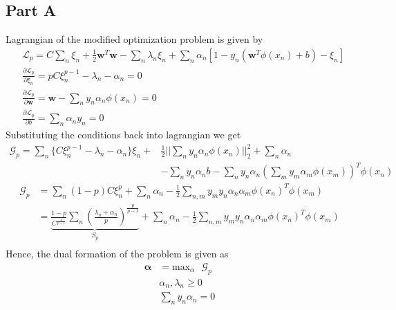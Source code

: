 \documentclass[11pt]{article}
\begin{document}
\subsection{Part A}
Lagrangian of the modified optimization problem is given by
\begin{equation*}
	\begin{split}
		& \mathcal{L}_p = C\sum_n\xi_n + \frac{1}{2}\boldsymbol{w}^T\boldsymbol{w} - \sum_n\lambda_n\xi_n + \sum_n\alpha_n[1-y_n(\boldsymbol{w}^T\phi(x_n)+b)-\xi_n] \\
		& \frac{\partial \mathcal{L}_p}{\partial \xi_n} = pC\xi_n^{p-1} - \lambda_n - \alpha_n = 0 \\
		& \frac{\partial \mathcal{L}_p}{\partial \boldsymbol{w}} = \boldsymbol{w} - \sum_ny_n\alpha_n\phi(x_n) = 0 \\
		& \frac{\partial \mathcal{L}_p}{\partial b} = \sum_n\alpha_ny_n = 0
	\end{split}
\end{equation*}
Substituting the conditions back into lagrangian we get
\begin{equation*}
		\begin{split}
			\mathcal{G}_p = \sum_n\{C\xi_n^{p-1} - \lambda_n - \alpha_n\}\xi_n + & \frac{1}{2}||\sum_ny_n\alpha_n\phi(x_n)||_2^2 + \sum_n\alpha_n \\
			& -\sum_ny_n\alpha_nb - \sum_ny_n\alpha_n(\sum_my_m\alpha_m\phi(x_m))^T\phi(x_n)
		\end{split}
\end{equation*}
\begin{equation*}
	\begin{split}
		\mathcal{G}_p & = \sum_n(1-p)C\xi_n^p + \sum_n\alpha_n - \frac{1}{2} \sum_{n,m}y_my_n\alpha_n\alpha_m\phi(x_n)^T\phi(x_m) \\
		& = \underbrace{\frac{1-p}{C^{\frac{1}{p-1}}}\sum_n(\frac{\lambda_n + \alpha_n}{p})^{\frac{p}{p-1}}}_{S_p} + \sum_n\alpha_n	- \frac{1}{2} \sum_{n,m}y_my_n\alpha_n\alpha_m\phi(x_n)^T\phi(x_m) \\ 	
	\end{split}
\end{equation*}
Hence, the dual formation of the problem is given as 
\begin{equation*}
	\begin{split}
		\boldsymbol{\alpha} &= \text{max}_{\alpha}\text{  }\mathcal{G}_p \\
		&\alpha_n,\lambda_n \geq 0 \\
		& \sum_n y_n \alpha_n = 0 \\
	\end{split}
\end{equation*}
\end{document}
